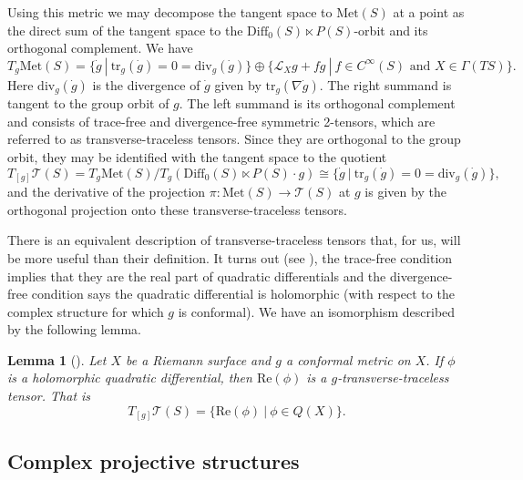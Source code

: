 \documentclass{amsart}
\newtheorem{lem}[thm]{Lemma}
\begin{document}
Using this metric we may decompose the tangent space to $\mathrm{Met}(S)$ at a point as the direct sum of the tangent space to the $\mathrm{Diff}_0(S) \ltimes P(S)$-orbit and its orthogonal complement. 
We have
\[
T_g \mathrm{Met}(S) = \{ \dot{g} \ | \ \mathrm{tr}_g(\dot{g}) = 0 = \mathrm{div}_g(\dot{g})\} \oplus \{ \mathcal{L}_X g + fg \ | \ f \in C^\infty(S) \text{ and } X \in \Gamma(TS) \}.
\]
Here $\mathrm{div}_g(\dot{g})$ is the divergence of $\dot{g}$ given by $\mathrm{tr}_g(\nabla \dot{g})$. 
The right summand is tangent to the group orbit of $g$. 
The left summand is its orthogonal complement and consists of trace-free and divergence-free symmetric 2-tensors, which are referred to as transverse-traceless tensors. 
Since they are orthogonal to the group orbit, they may be identified with the tangent space to the quotient
\[
T_{[g]} \mathcal{T}(S) = T_g \mathrm{Met}(S)/T_g(\mathrm{Diff}_0(S) \ltimes P(S) \cdot g) \cong \{ \dot{g} \ | \ \mathrm{tr}_g(\dot{g}) = 0 = \mathrm{div}_g(\dot{g})\},
\]
and the derivative of the projection $\pi: \mathrm{Met}(S) \to \mathcal{T}(S)$ at $g$ is given by the orthogonal projection onto these transverse-traceless tensors. 

There is an equivalent description of transverse-traceless tensors that, for us, will be more useful than their definition. 
It turns out (see \cite{tromba1992}), the trace-free condition implies that they are the real part of quadratic differentials and the divergence-free condition says the quadratic differential is holomorphic (with respect to the complex structure for which $g$ is conformal). 
We have an isomorphism described by the following lemma.

\begin{lem}[\cite{tromba1992}] \label{tangent-teich}
Let $X$ be a Riemann surface and $g$ a conformal metric on $X$. 
If $\phi$ is a holomorphic quadratic differential, then $\mathrm{Re}(\phi)$ is a $g$-transverse-traceless tensor. 
That is 
\[
T_{[g]}\mathcal{T}(S) = \{\mathrm{Re}(\phi) \ | \ \phi \in Q(X) \}.
\]
\end{lem}



\subsection{Complex projective structures}
\end{document}
